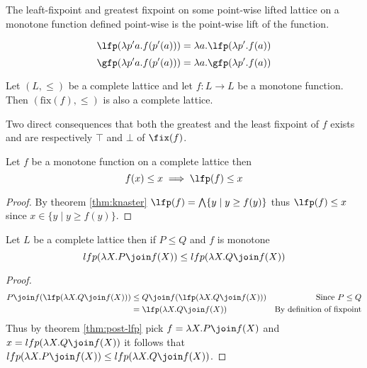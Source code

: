 \begin{theorem}
  \label{th:pointfix}
  The leaft-fixpoint and greatest fixpoint on some point-wise lifted lattice on 
  a monotone function defined point-wise is the point-wise lift of the function.

  $$\lfp(\lambda p' a . f(p'(a))) = \lambda a . \lfp(\lambda p' . f(a))$$
  $$\gfp(\lambda p' a . f(p'(a))) = \lambda a . \gfp(\lambda p' . f(a))$$
\end{theorem}

\begin{theorem}
  \label{thm:knaster}
  Let $(L, \leq)$ be a complete lattice and let $f : L \to L$ be a monotone 
  function. Then $(\text{fix}(f), \leq)$ is also a complete lattice.
\end{theorem}

Two direct consequences that both the greatest and the least fixpoint of
$f$ exists and are respectively $\top$ and $\bot$ of $\fix(f)$.

\begin{theorem}
  \label{thm:post-lfp}
  Let $f$ be a monotone function on a complete lattice then
  $$f(x) \leq x \implies \lfp(f) \leq x$$
\end{theorem}
\begin{proof}
  By theorem \ref{thm:knaster} $\lfp(f) = \bigwedge\{ y \mid y \geq f(y) \}$
  thus $\lfp(f) \leq x$ since $x \in \{ y \mid y \geq f(y) \}$.
\end{proof}

\begin{theorem}
  \label{thm:lfp-mono}
  Let $L$ be a complete lattice then if $P \leq Q$ and $f$ is monotone
  $$lfp(\lambda X. P \join f(X)) \leq lfp(\lambda X. Q \join f(X))$$
\end{theorem}
\begin{proof}
  \begin{align*}
    P \join f(\lfp(\lambda X . Q \join f(X)))
      &\leq Q \join f(\lfp(\lambda X . Q \join f(X)))
      &\text{Since $P \leq Q$} \\
      &= \lfp(\lambda X . Q \join f(X))
      &\text{By definition of fixpoint} \\
  \end{align*}
  Thus by theorem \ref{thm:post-lfp} pick $f = \lambda X . P \join f(X)$ and
  $x = lfp(\lambda X. Q \join f(X))$ it follows that
  $lfp(\lambda X. P \join f(X)) \leq lfp(\lambda X. Q \join f(X))$.
\end{proof}

